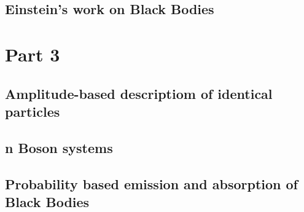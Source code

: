 \documentclass[aspectratio=169]{beamer}
\begin{document}
\subsection{Einstein's work on Black Bodies}
\begin{frame}

\end{frame}

\section{Part 3}
\subsection{Amplitude-based descriptiom of identical particles}
\begin{frame}

\end{frame}

\subsection{n Boson systems}
\begin{frame}

\end{frame}

\subsection{Probability based emission and absorption of Black Bodies}
\begin{frame}

\end{frame}
\end{document}
